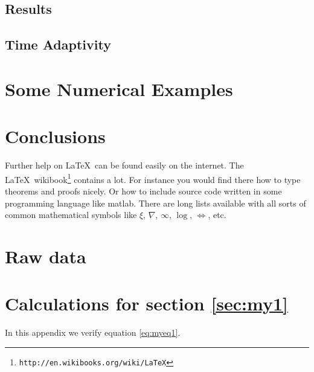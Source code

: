 \documentclass{uonmathreport}
\theoremstyle{definition}
\theoremstyle{problem}
\theoremstyle{theorem}
\begin{document}
\subsection{Results} \label{subsec:results3}

\subsection{Time Adaptivity} \label{subsubsec:Time Adaptivity}

\newpage

\section{Some Numerical Examples} \label{sec:Examples}

\newpage


\section{Conclusions} \label{sec:conclusions}

Further help on \LaTeX\ can be found easily on the internet. The \LaTeX\
wikibook\footnote{\tt http://en.wikibooks.org/wiki/LaTeX} contains a lot.
For instance you would find there how to type theorems and proofs nicely.
Or how to include source code written in some programming language like
matlab. There are long lists available with all sorts of common
mathematical symbols like $\xi$, $\nabla$, $\infty$, $\log$, $\iff$, etc.

\newpage

\appendix

\section{Raw data} \label{app:rawdata}



\section{Calculations for section \ref{sec:my1}} \label{app:calculations}

In this appendix we verify equation \eqref{eq:myeq1}.

\newpage

	
	
\end{document}
